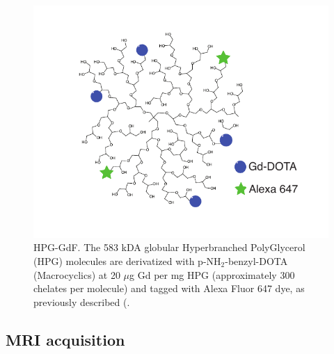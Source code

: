 \begin{figure}[htbp]
 \begin{center}
 \includegraphics[width=\textwidth]{hpg/hpg-paper1-images/hpg_fig1-hpgdf.pdf}
 \caption{\acs{HPG-GdF}. The 583  \acs{kDA} globular Hyperbranched PolyGlycerol (HPG) molecules are derivatized with p-NH$_2$-benzyl-DOTA (Macrocyclics) at 20 $\mu$g Gd per mg HPG (approximately 300 chelates per molecule) and tagged with Alexa Fluor 647 dye, as previously described (\cite{Saatchi:2012hc}.}
 \label{hpgpaper1:fig1}
 \end{center}
\end{figure}

\subsection{MRI acquisition}

